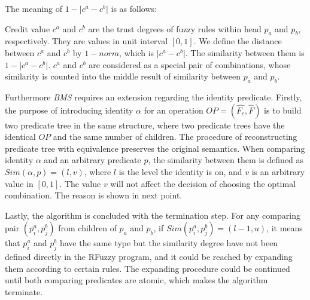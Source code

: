  The meaning of  $1- \lvert c^a - c^b  \rvert$ is as follows:
 
 Credit value $c^a$ and $c^b$ are the trust degrees of fuzzy rules within head $p_a$ and $p_b$, respectively. They are values in unit interval $[0,1]$. We define the distance between 
$c^a$ and $c^b$ by $1-norm$, which is $\lvert c^a-c^b \rvert$. The similarity between them is  $1- \lvert c^a - c^b  \rvert$. $c^a$ and $c^b$ are considered as a special pair of combinations, whose similarity is counted into the middle result of similarity between $p_a$ and $p_b$.  

Furthermore \textit{BMS} requires an extension regarding the identity predicate. Firstly, the purpose of introducing identity $\alpha$ for an operation $OP=(\hat{F_c},\hat{F})$ is to build two predicate tree in the same structure, where two predicate trees have the identical $OP$ and the same number of children. The procedure of reconstructing predicate tree with equivalence preserves the original semantics. When comparing identity $\alpha$ and an arbitrary predicate $p$, the similarity between them is defined as $Sim(\alpha, p) = (l, v)$, where $l$ is the level the identity is on, and $v$ is an arbitrary value in $[0,1]$. The value $v$ will not affect the decision of choosing the optimal combination. The reason is shown in next point.  

Lastly, the algorithm is concluded with the termination step. 	For any comparing pair $(p_i^a,p_j^b)$ from children of $p_a$ and $p_b$, if $Sim(p_i^a,p_j^b)=(l-1,u)$, it means that $p_i^a$ and $p_j^b$ have the same type but the similarity degree have not been defined directly in the RFuzzy program, and it could be reached by expanding them according to certain rules. The expanding procedure could be continued until both comparing predicates are atomic, which makes the algorithm terminate.


